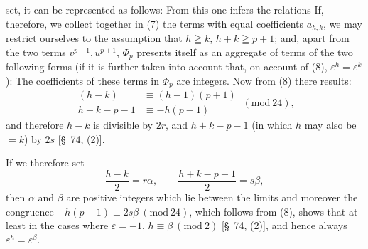 set, it can be represented as follows:
From this one infers the relations
If, therefore, we collect together in (7) the terms with equal
coefficients $a_{h,k}$, we may restrict ourselves to the assumption
that $h\geqq k$, $h+k\geqq p+1$; and, apart from the two terms
$v^{p+1}, u^{p+1}$, $\Phi_p$ presents itself as an aggregate of
terms of the two following forms (if it is further taken into
account that, on account of (8), $\varepsilon^h=\varepsilon^k$):
The coefficients of these terms in $\Phi_p$ are integers.
Now from (8) there results:
\[
\begin{aligned}
(h-k)&\equiv (h-1)(p+1)\\
h+k-p-1&\equiv -h(p-1)
\end{aligned}
\ (\mathrm{mod}\ 24),
\]
and therefore $h-k$ is divisible by $2r$, and $h+k-p-1$ (in which
$h$ may also be $=k$) by $2s$ [\S\ 74, (2)].

If we therefore set
\[
\frac{h-k}{2}=r\alpha, \qquad \frac{h+k-p-1}{2}=s\beta,
\]
then $\alpha$ and $\beta$ are positive integers which lie between
the limits
and moreover the congruence $-h(p-1)\equiv 2s\beta\ (\mathrm{mod}\ 24)$,
which follows from (8), shows that at least in the cases where
$\varepsilon=-1$, $h\equiv\beta\ (\mathrm{mod}\ 2)$
[\S\ 74, (2)], and hence always $\varepsilon^h=\varepsilon^\beta$.
